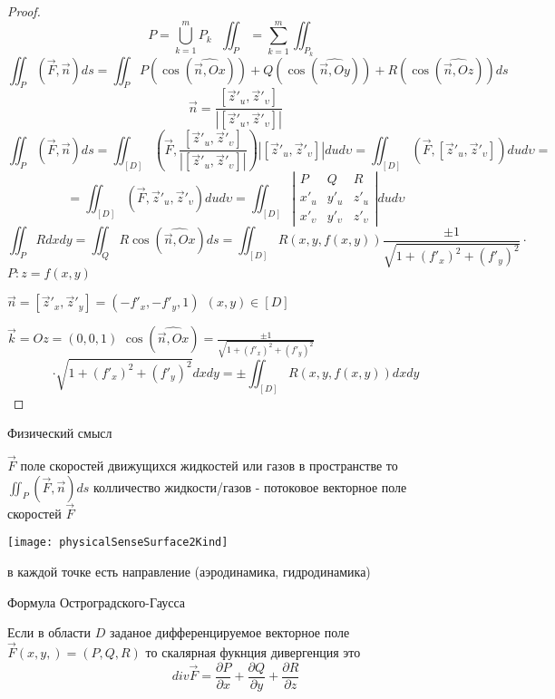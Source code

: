 \begin{proof}
  $$
  P = \bigcup_{k=1}^m P_k ~~~ \iint_P = \sum_{k=1}^m \iint_{P_k}
  $$
  $$
  \iint_P (\vec F, \vec n) ds = \iint_P
  P(\cos(\widehat{\vec n, Ox})) +
  Q(\cos(\widehat{\vec n, Oy})) +
  R(\cos(\widehat{\vec n, Oz}))ds
  $$
  $$
  \vec n = \frac{[\vec z'_u, \vec z'_{\upsilon}]}
  {|[\vec z'_u, \vec z'_{\upsilon}]|}
  $$
  $$
  \iint_P (\vec F, \vec n) ds = \iint_{[D]} \left( \vec F,
  \frac{[\vec z'_u, \vec z'_{\upsilon}]}
  {|[\vec z'_u, \vec z'_{\upsilon}]|} \right) |[\vec z'_u, \vec z'_{\upsilon}]|
  du d\upsilon = \iint_{[D]} (\vec F,[\vec z'_u, \vec z'_{\upsilon}])du
  d\upsilon =
  $$
  $$
  =
  \iint_{[D]} (\vec F, \vec z'_u , \vec z'_{\upsilon}) du d\upsilon
  = \iint_{[D]}
  \left|
  \begin{array}{ccc}
    P & Q & R \\
    x'_u & y'_u & z'_u \\
    x'_{\upsilon} & y'_{\upsilon} & z'_{\upsilon}
  \end{array}
  \right| du d\upsilon
  $$
  $$
  \iint_P R dx dy = \iint_Q R \cos(\widehat{\vec n, Ox}) ds = \iint_{[D]}
  R(x,y,f(x,y)) \frac{\pm 1}{\sqrt{1 + (f'_x)^2 + (f'_y)^2}} \cdot
  $$
  $P: z = f(x,y)$

  $\vec n = [\vec z'_x, \vec z'_y] = (-f'_x, -f'_y, 1) ~~ (x,y) \in [D]$

  $\vec k = Oz = (0,0,1)$
  $\cos(\widehat{\vec n, Ox}) = \frac{\pm 1}{\sqrt{1 + (f'_x)^2 + (f'_y)^2}}$
  $$
  \cdot \sqrt{1 + (f'_x)^2 + (f'_y)^2} dx dy = \pm \iint_{[D]} R(x,y, f(x,y))
  dx dy
  $$
\end{proof}

\begin{title}[\Large]
  Физический смысл
\end{title}

$\vec F$ поле скоростей движущихся жидкостей или газов в пространстве то
$\iint_P (\vec F, \vec n) ds$ колличество жидкости/газов - потоковое векторное
поле скоростей $\vec F$

\texttt{[image: physicalSenseSurface2Kind]}

в каждой точке есть направление (аэродинамика, гидродинамика)

\begin{title}[\Large]
  Формула Остроградского-Гаусса
\end{title}

\begin{define}[дивергенции]
  Если в области $D$ заданое дифференцируемое векторное поле $\vec F(x,y,)
  = (P, Q, R)$ то скалярная фукнция дивергенция это
  $$
  div \vec F = \frac{\partial P}{\partial x} + \frac{\partial Q}{\partial y}
  + \frac{\partial R}{\partial z}
  $$
\end{define}

